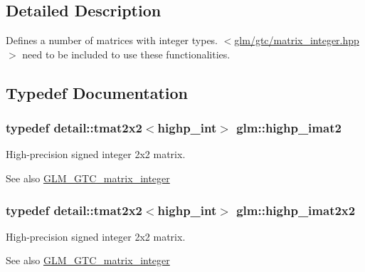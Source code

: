 \subsection{Detailed Description}
Defines a number of matrices with integer types. $<$\hyperlink{matrix__integer_8hpp}{glm/gtc/matrix\+\_\+integer.\+hpp}$>$ need to be included to use these functionalities. 

\subsection{Typedef Documentation}
\hypertarget{group__gtc__matrix__integer_ga83bfb0be8d0a12b7c5e7c4af0eb9f828}{}
\subsubsection[{highp\+\_\+imat2}]{\setlength{\rightskip}{0pt plus 5cm}typedef detail\+::tmat2x2$<$highp\+\_\+int$>$ {\bf glm\+::highp\+\_\+imat2}}\label{group__gtc__matrix__integer_ga83bfb0be8d0a12b7c5e7c4af0eb9f828}
High-\/precision signed integer 2x2 matrix. \begin{DoxySeeAlso}{See also}
\hyperlink{group__gtc__matrix__integer}{G\+L\+M\+\_\+\+G\+T\+C\+\_\+matrix\+\_\+integer} 
\end{DoxySeeAlso}
\hypertarget{group__gtc__matrix__integer_ga5cd1cd0f7e30ec150285e6cf28d75975}{}
\subsubsection[{highp\+\_\+imat2x2}]{\setlength{\rightskip}{0pt plus 5cm}typedef detail\+::tmat2x2$<$highp\+\_\+int$>$ {\bf glm\+::highp\+\_\+imat2x2}}\label{group__gtc__matrix__integer_ga5cd1cd0f7e30ec150285e6cf28d75975}
High-\/precision signed integer 2x2 matrix. \begin{DoxySeeAlso}{See also}
\hyperlink{group__gtc__matrix__integer}{G\+L\+M\+\_\+\+G\+T\+C\+\_\+matrix\+\_\+integer} 
\end{DoxySeeAlso}
\hypertarget{group__gtc__matrix__integer_ga06f89e9faac42bc0ac6628e83244a488}{}
